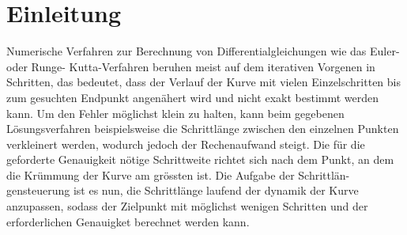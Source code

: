 %
%
%
\section{Einleitung\label{steps:section:einleitung}}

Numerische Verfahren zur Berechnung von Differentialgleichungen wie das Euler- oder Runge-
Kutta-Verfahren beruhen meist auf dem iterativen Vorgenen in Schritten, das bedeutet, dass der Verlauf
der Kurve mit vielen Einzelschritten bis zum gesuchten Endpunkt angenähert wird und nicht exakt
bestimmt werden kann. Um den Fehler möglichst klein zu halten, kann beim gegebenen Lösungsverfahren beispielsweise die Schrittlänge zwischen den einzelnen Punkten verkleinert werden, wodurch
jedoch der Rechenaufwand steigt. Die für die geforderte Genauigkeit nötige Schrittweite richtet sich
nach dem Punkt, an dem die Krümmung der Kurve am grössten ist. Die Aufgabe der Schrittlän-
gensteuerung ist es nun, die Schrittlänge laufend der dynamik der Kurve anzupassen, sodass der
Zielpunkt mit möglichst wenigen Schritten und der erforderlichen Genauigket berechnet werden
kann.
